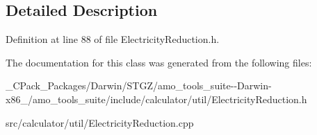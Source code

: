 \subsection{Detailed Description}


Definition at line 88 of file Electricity\+Reduction.\+h.



The documentation for this class was generated from the following files\+:\begin{DoxyCompactItemize}
\item 
\+\_\+\+C\+Pack\+\_\+\+Packages/\+Darwin/\+S\+T\+G\+Z/amo\+\_\+tools\+\_\+suite-\/-\/\+Darwin-\/x86\+\_/amo\+\_\+tools\+\_\+suite/include/calculator/util/Electricity\+Reduction.\+h\item 
src/calculator/util/Electricity\+Reduction.\+cpp\end{DoxyCompactItemize}
